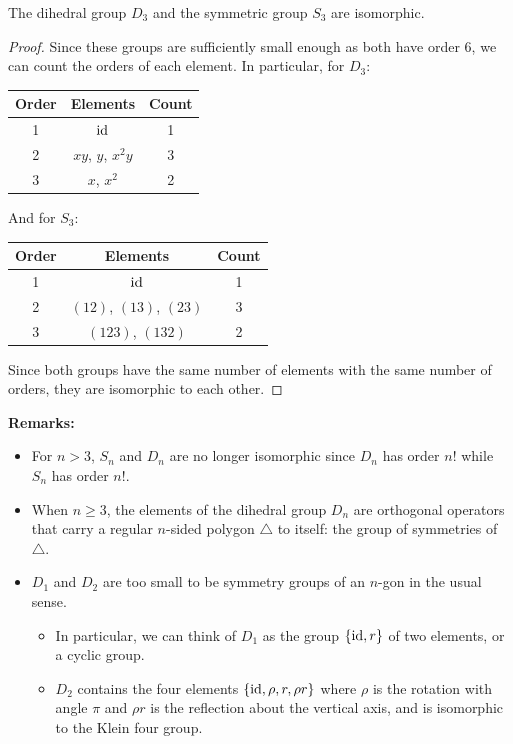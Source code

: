 \documentclass[letterpaper]{article}
\begin{document}
\begin{corollary}{}{}
    The dihedral group $D_3$ and the symmetric group $S_3$ are isomorphic. 
\end{corollary}
\begin{mdframed}
    \begin{proof}
        Since these groups are sufficiently small enough as both have order 6, we can count the orders of each element. In particular, for $D_3$: 
        \begin{center}
            \begin{tabular}{c|c|c}
                \textbf{Order} & \textbf{Elements} & \textbf{Count} \\ 
                \hline 
                1 & $\operatorname{id}$ & 1 \\ 
                2 & $xy$, $y$, $x^2 y$ & 3 \\ 
                3 & $x$, $x^2$ & 2
            \end{tabular}
        \end{center}

        And for $S_3$: 
        \begin{center}
            \begin{tabular}{c|c|c}
                \textbf{Order} & \textbf{Elements} & \textbf{Count} \\ 
                \hline 
                1 & $\operatorname{id}$ & 1 \\ 
                2 & $(12)$, $(13)$, $(23)$ & 3 \\ 
                3 & $(123)$, $(132)$ & 2
            \end{tabular}
        \end{center}
        
        Since both groups have the same number of elements with the same number of orders, they are isomorphic to each other. 
    \end{proof}
\end{mdframed}
\textbf{Remarks:}
\begin{itemize}
    \item For $n > 3$, $S_n$ and $D_n$ are no longer isomorphic since $D_n$ has order $n!$ while $S_n$ has order $n!$. 
    \item When $n \geq 3$, the elements of the dihedral group $D_n$ are orthogonal operators that carry a regular $n$-sided polygon $\triangle$ to itself: the group of symmetries of $\triangle$. 
    \item $D_1$ and $D_2$ are too small to be symmetry groups of an $n$-gon in the usual sense.
    \begin{itemize}
        \item In particular, we can think of $D_1$ as the group $\{\operatorname{id}, r\}$ of two elements, or a cyclic group. 
        \item $D_2$ contains the four elements $\{\operatorname{id}, \rho, r, \rho r\}$ where $\rho$ is the rotation with angle $\pi$ and $\rho r$ is the reflection about the vertical axis, and is isomorphic to the Klein four group. 
    \end{itemize}
\end{itemize}
\end{document}

